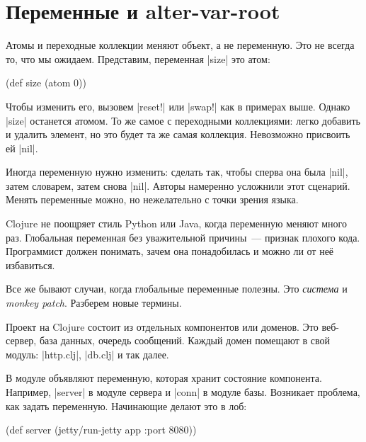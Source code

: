 \section{Переменные и alter-var-root}

\label{alter-var-root}

Атомы и переходные коллекции меняют объект, а не переменную. Это не всегда то,
что мы ожидаем. Представим, переменная \spverb|size| это атом:

\begin{english}
  \begin{clojure}
(def size (atom 0))
  \end{clojure}
\end{english}

Чтобы изменить его, вызовем \spverb|reset!| или \spverb|swap!| как в примерах
выше. Однако \spverb|size| останется атомом. То же самое с переходными
коллекциями: легко добавить и удалить элемент, но это будет та же самая
коллекция. Невозможно присвоить ей \spverb|nil|.

Иногда переменную нужно изменить: сделать так, чтобы сперва она была
\spverb|nil|, затем словарем, затем снова \spverb|nil|. Авторы намеренно
усложнили этот сценарий. Менять переменные можно, но нежелательно с точки зрения
языка.

Clojure не поощряет стиль Python или Java, когда переменную меняют много
раз. Глобальная переменная без уважительной причины~--- признак плохого кода.
Программист должен понимать, зачем она понадобилась и можно ли от не\"{е}
избавиться.

Все же бывают случаи, когда глобальные переменные полезны. Это \emph{система} и
\emph{monkey patch}. Разберем новые термины.

Проект на Clojure состоит из отдельных компонентов или доменов. Это веб-сервер,
база данных, очередь сообщений. Каждый домен помещают в свой модуль:
\spverb|http.clj|, \spverb|db.clj| и так далее.

В модуле объявляют переменную, которая хранит состояние компонента. Например,
\spverb|server| в модуле сервера и \spverb|conn| в модуле базы. Возникает
проблема, как задать переменную. Начинающие делают это в лоб:

\begin{english}
  \begin{clojure}
(def server (jetty/run-jetty app {:port 8080}))
  \end{clojure}
\end{english}

